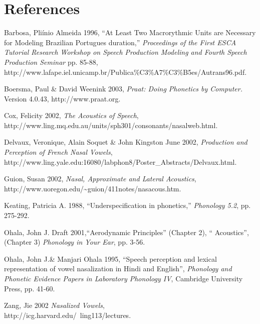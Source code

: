 \documentclass[12pt,twoside,leqno]{article}%
\begin{document}
\section[References]{References}
\begin{description}
\item  \label{bib:barbosa} Barbosa, Pliínio Almeida  1996, ``At Least Two Macrorythmic Units are Necessary for Modeling Brazilian Portugues duration,'' {\it Proceedings of the First ESCA Tutorial Research Workshop on Speech Production Modeling and Fourth Speech Production Seminar} pp. 85-88,\\
http://www.lafape.iel.unicamp.br/Publica\%C3\%A7\%C3\%B5es/Autrans96.pdf.

\item \label{bib:boersma} Boersma, Paul \& David Weenink 2003, {\it Praat: Doing Phonetics by Computer.}  Version 4.0.43, http://www.praat.org.
\item \label{bib:cox} Cox, Felicity  2002, {\it The Acoustics of Speech},\\
 http://www.ling.mq.edu.au/units/sph301/consonants/nasalweb.html.
\item \label{bib:delvaux}Delvaux, Veronique, Alain Soquet \& John Kingston June 2002, {\it Production and Perception of French Nasal Vowels},\\
 http://www.ling.yale.edu:16080/labphon8/Poster\_Abstracts/Delvaux.html.
\item \label{bib:guion} Guion, Susan 2002, {\it Nasal, Approximate and Lateral Acoustics},\\
http://www.uoregon.edu/\~{}guion/411notes/nasacous.htm.
\item \label{bib:keating} Keating, Patricia A. 1988, ``Underspecification in phonetics,'' {\it Phonology 5.2}, pp. 275-292.
\item \label{bib:ohala} Ohala, John J. Draft 2001,``Aerodynamic Principles'' (Chapter 2), `` Acoustics'', (Chapter 3) {\it Phonology in Your Ear}, pp. 3-56.
\item \label{bib:ohalas} Ohala, John J.\& Manjari Ohala 1995, ``Speech perception and lexical representation of vowel nasalization in Hindi and English'', {\it  Phonology and Phonetic Evidence Papers in Laboratory Phonology IV}, Cambridge University Press, pp. 41-60.
\item \label{bib:zang} Zang, Jie 2002 {\it Nasalized Vowels},\\
 http://icg.harvard.edu/~ling113/lectures.
\end{description}
\end{document}
